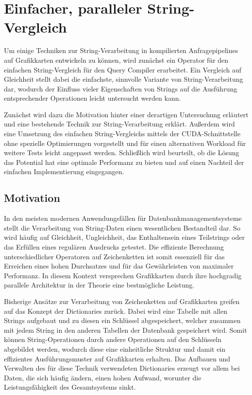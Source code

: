 \chapter{Einfacher, paralleler String-Vergleich}

Um einige Techniken zur String-Verarbeitung in kompilierten Anfragepipelines auf Grafikkarten entwickeln zu können, wird zunächst ein Operator für den einfachen String-Vergleich für den Query Compiler erarbeitet.
Ein Vergleich auf Gleichheit stellt dabei die einfachste, sinnvolle Variante von String-Verarbeitung dar, wodurch der Einfluss vieler Eigenschaften von Strings auf die Ausführung entsprechender Operationen leicht untersucht werden kann.

Zunächst wird dazu die Motivation hinter einer derartigen Untersuchung erläutert und eine bestehende Technik zur String-Verarbeitung erklärt.
Außerdem wird eine Umsetzung des einfachen String-Vergleichs mittels der CUDA-Schnittstelle ohne spezielle Optimierungen vorgestellt und für einen alternativen Workload für weitere Tests leicht angepasst werden.
Schließlich wird beurteilt, ob die Lösung das Potential hat eine optimale Performanz zu bieten und auf einen Nachteil der einfachen Implementierung eingegangen.

\section{Motivation}

In den meisten modernen Anwendungsfällen für Datenbankmanagementsysteme stellt die Verarbeitung von String-Daten einen wesentlichen Bestandteil dar.
So wird häufig auf Gleichheit, Ungleichheit, das Enthaltensein eines Teilstrings oder das Erfüllen eines regulären Ausdrucks getestet.
Die effiziente Berechnung unterschiedlicher Operatoren auf Zeichenketten ist somit essenziell für das Erreichen eines hohen Durchsatzes und für das Gewährleisten von maximaler Performanz.
In diesem Kontext versprechen Grafikkarten durch ihre hochgradig parallele Architektur in der Theorie eine bestmögliche Leistung.

Bisherige Ansätze zur Verarbeitung von Zeichenketten auf Grafikkarten greifen auf das Konzept der Dictionaries zurück.
Dabei wird eine Tabelle mit allen Strings aufgebaut und zu diesen ein Schlüssel abgespeichert, welcher zusammen mit jedem String in den anderen Tabellen der Datenbank gespeichert wird.
Somit können String-Operationen durch andere Operationen auf den Schlüsseln abgebildet werden, wodurch diese eine einheitliche Struktur und damit ein effizientes Ausführungsmuster auf Grafikkarten erhalten.
Das Aufbauen und Verwalten des für diese Technik verwendeten Dictionaries erzeugt vor allem bei Daten, die sich häufig ändern, einen hohen Aufwand, worunter die Leistungsfähigkeit des Gesamtsystems sinkt.

